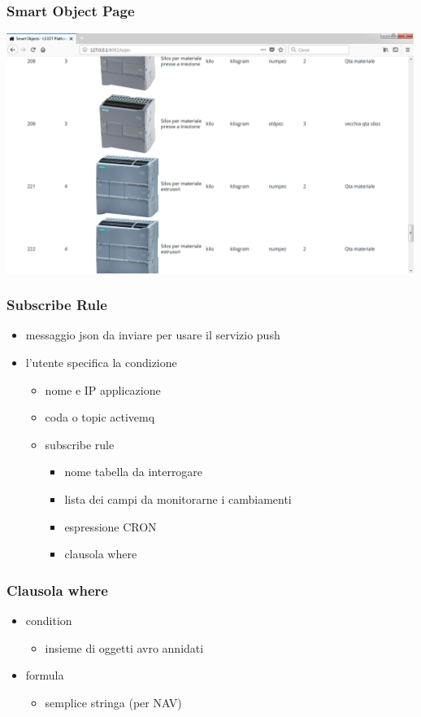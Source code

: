 \documentclass{beamer}
\begin{document}
\begin{frame}
\frametitle{Smart Object Page}
\includegraphics[width=1\textwidth]{images/SmartObjectsPlatform.png}
\end{frame}

\begin{frame}
\frametitle{Subscribe Rule}
\begin{itemize}
\item messaggio json da inviare per usare il servizio push
\item l'utente specifica la condizione
\begin{itemize}
\item nome e IP applicazione
\item coda o topic activemq
\item subscribe rule
\begin{itemize}
\item nome tabella da interrogare
\item lista dei campi da monitorarne i cambiamenti
\item espressione CRON
\item clausola where

\end{itemize}
\end{itemize}
\end{itemize}
\end{frame}

\begin{frame}
\frametitle{Clausola where}
\begin{itemize}
\item condition
\begin{itemize}
\item insieme di oggetti avro annidati
\end{itemize}
\item formula
\begin{itemize}
\item semplice stringa (per NAV)
\end{itemize}
\end{itemize}
\end{frame}
\end{document}
